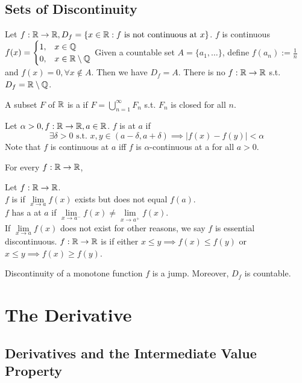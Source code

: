 \documentclass[11pt]{article}
\begin{document}
\subsection{Sets of Discontinuity}
Let $f: \mathbb{R} \rightarrow \mathbb{R}, D_f = \{x \in \mathbb{R}: f \text{ is not continuous at }x\}$.
\example[$D_f = \emptyset$] $f$ is continuous
\example[$D_f = \real$] $f(x) = \begin{cases}
	1, & x\in \mathbb{Q}\\
	0, & x \in \mathbb{R} \setminus \mathbb{Q}
\end{cases} $
\example Given a countable set $A = \{a_1, \hdots\}$, define $f(a_n) := \frac{1}{n}$ and $f(x) = 0, \forall x \notin A$. Then we have $D_f = A$.
\fact There is no $f: \mathbb{R} \rightarrow \mathbb{R}$ s.t. $D_f = \mathbb{R} \setminus \mathbb{Q}$.

 A subset $F$ of $\mathbb{R}$ is a  if $F = \bigcup_{n=1}^\infty F_n$ s.t. $F_n$ is closed for all $n$.

 Let $\alpha > 0, f:\mathbb{R} \rightarrow \mathbb{R}, a \in \mathbb{R}$. $f$ is  at $a$ if
$$\exists \delta > 0 \text{ s.t. } x, y \in (a - \delta, a + \delta) \implies |f(x) - f(y)| < \alpha$$
Note that $f$ is continuous at $a$ iff $f$ is $\alpha$-continuous at a for all $a > 0$.

\property For every $f: \mathbb{R} \rightarrow \mathbb{R}$, 

 Let $f: \mathbb{R} \rightarrow \mathbb{R}$. \\
$f$ is  if $\underset{x \rightarrow a}{\lim} f(x)$ exists but does not equal $f(a)$.\\
$f$ has a  at $a$ if $\underset{x \rightarrow a^-}{\lim} f(x) \neq \underset{x \rightarrow a^+}{\lim} f(x)$. \\
If $\underset{x \rightarrow a}{\lim} f(x)$ does not exist for other reasons, we say $f$ is essential discontinuous.
 $f: \mathbb{R} \rightarrow \mathbb{R}$ is  if either $x \leq y \implies f(x) \leq f(y)$ or $x \leq y \implies f(x) \geq f(y)$.

\property
Discontinuity of a monotone function $f$ is a jump. Moreover, $D_f$ is countable.

\section{The Derivative}
\subsection{Derivatives and the Intermediate Value Property}
\end{document}
